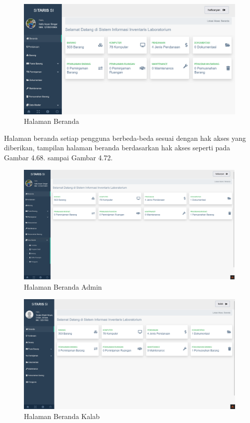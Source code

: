 \begin{enumerate}
        \begin{figure}
          \centering
          \includegraphics[width=0.82\linewidth]{konten//gambar/login berhasil.png}
          \caption{Halaman Beranda}
          \label{fig:enter-label}
        \end{figure}

        Halaman beranda setiap pengguna berbeda-beda sesuai dengan hak akses yang diberikan, tampilan halaman beranda berdasarkan hak akses seperti pada Gambar 4.68. sampai Gambar 4.72.

        \begin{figure}
          \centering
          \includegraphics[width=0.82\linewidth]{konten//gambar/admin.png}
          \caption{Halaman Beranda Admin}
          \label{fig:enter-label}
        \end{figure}

        \begin{figure}
          \centering
          \includegraphics[width=0.82\linewidth]{konten//gambar/kalab.png}
          \caption{Halaman Beranda Kalab}
          \label{fig:enter-label}
        \end{figure}


\end{enumerate}
